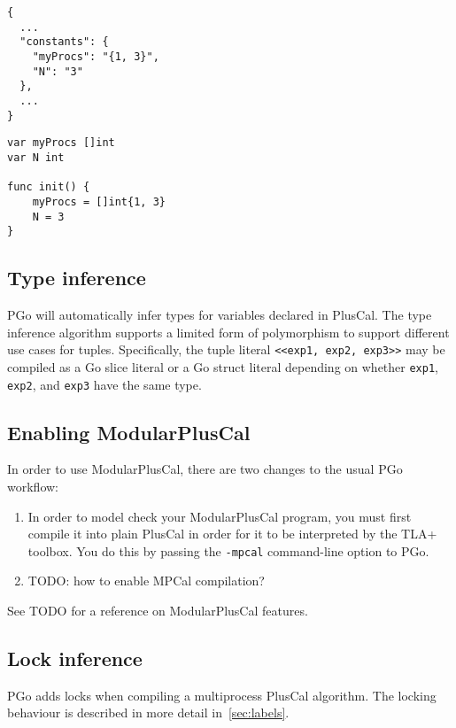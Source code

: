 \noindent\begin{minipage}{0.45\textwidth}
\begin{lstlisting}
{
  ...
  "constants": {
    "myProcs": "{1, 3}",
    "N": "3"
  },
  ...
}
\end{lstlisting}
\end{minipage}
\hfill\begin{minipage}{0.45\textwidth}
\begin{lstlisting}[language=golang]
var myProcs []int
var N int

func init() {
	myProcs = []int{1, 3}
	N = 3
}
\end{lstlisting}
\end{minipage}

\subsection{Type inference}
PGo will automatically infer types for variables declared in PlusCal. The type inference algorithm supports a limited form of polymorphism to support different use cases for tuples. Specifically, the tuple literal \lstinline[language=pcal]|<<exp1, exp2, exp3>>| may be compiled as a Go slice literal or a Go struct literal depending on whether \lstinline[language=pcal]|exp1|, \lstinline[language=pcal]|exp2|, and \lstinline[language=pcal]|exp3| have the same type.

\subsection{Enabling ModularPlusCal}

In order to use ModularPlusCal, there are two changes to the usual PGo workflow:
\begin{enumerate}
    \item In order to model check your ModularPlusCal program, you must first compile it into plain PlusCal in order for it to be interpreted by the TLA+ toolbox. You do this by passing the \lstinline|-mpcal| command-line option to PGo.
    \item TODO: how to enable MPCal compilation?
\end{enumerate}

See TODO for a reference on ModularPlusCal features.

\subsection{Lock inference}
PGo adds locks when compiling a multiprocess PlusCal algorithm. The locking behaviour is described in more detail in~\ref{sec:labels}.
